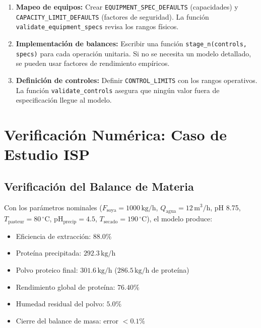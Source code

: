 \documentclass[10pt,letterpaper]{article}
\begin{document}
\begin{enumerate}
    \item \textbf{Mapeo de equipos:} Crear \texttt{EQUIPMENT\_SPEC\_}\allowbreak\texttt{DEFAULTS} (capacidades) y \texttt{CAPACITY\_LIMIT\_}\allowbreak\texttt{DEFAULTS} (factores de seguridad). La funci\'on \texttt{validate\_equipment\_}\allowbreak\texttt{specs} revisa los rangos f\'isicos.
    \item \textbf{Implementaci\'on de balances:} Escribir una funci\'on \texttt{stage\_n}\allowbreak\texttt{(controls,}\allowbreak\texttt{ specs)} para cada operaci\'on unitaria. Si no se necesita un modelo detallado, se pueden usar factores de rendimiento emp\'iricos.
    \item \textbf{Definici\'on de controles:} Definir \texttt{CONTROL\_}\allowbreak\texttt{LIMITS} con los rangos operativos. La funci\'on \texttt{validate\_}\allowbreak\texttt{controls} asegura que ning\'un valor fuera de especificaci\'on llegue al modelo.
\end{enumerate}

\section{Verificaci\'on Num\'erica: Caso de Estudio ISP}

\subsection{Verificaci\'on del Balance de Materia}

Con los par\'ametros nominales ($F_{\text{soya}} = 1000\,\text{kg/h}$, $Q_{\text{agua}} = 12\,\text{m}^3/\text{h}$, pH 8.75, $T_{\text{pasteur}} = 80\,^\circ\text{C}$, pH$_{\text{precip}} = 4.5$, $T_{\text{secado}} = 190\,^\circ\text{C}$), el modelo produce:

\begin{itemize}
    \item Eficiencia de extracci\'on: $88.0\%$
    \item Prote\'ina precipitada: $292.3\,\text{kg/h}$
    \item Polvo proteico final: $301.6\,\text{kg/h}$ ($286.5\,\text{kg/h}$ de prote\'ina)
    \item Rendimiento global de prote\'ina: $76.40\%$
    \item Humedad residual del polvo: $5.0\%$
    \item Cierre del balance de masa: error $<0.1\%$
\end{itemize}
\end{document}
